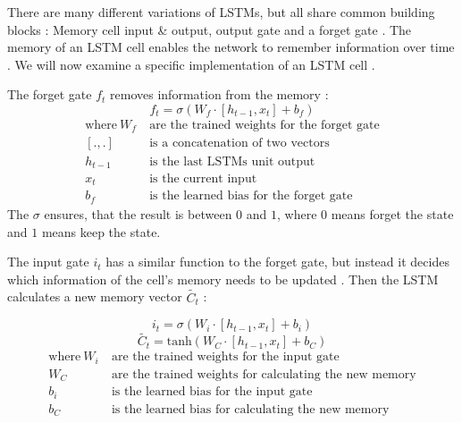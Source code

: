 \documentclass[draft,final,oneside]{vutinfth} %
\begin{document}
There are many different variations of LSTMs, but all share common building blocks  \cite{colahlstm}: Memory cell input \& output, output gate and a forget gate  \cite{colahlstm}. The memory of an LSTM cell enables the network to remember information over time \cite{hochreiter}. We will now examine a specific implementation of an LSTM cell \cite{colahlstm}.

The forget gate $f_t$ removes information from the memory \cite{colahlstm}:
\begin{equation}
f_t = \sigma \left(W_f \cdot \left[ h_{t-1}, x_t \right] + b_f\right)
\end{equation}
\begin{align*}
\text{where}~W_f&~\text{are the trained weights for the forget gate} \\
\left[. , . \right]&~\text{is a concatenation of two vectors} \\
h_{t-1}&~\text{is the last LSTMs unit output} \\
x_t&~\text{is the current input} \\
b_f&~\text{is the learned bias for the forget gate}
\end{align*}
The $\sigma$ ensures, that the result is between $0$ and $1$, where $0$ means forget the state and $1$ means keep the state.

The input gate $i_t$ has a similar function to the forget gate, but instead it decides which information of the cell's memory needs to be updated \cite{hochreiter}. Then the LSTM calculates a new memory vector $\widetilde{C_t}$ \cite{colahlstm}:  

\begin{equation}
i_t=\sigma\left(W_i \cdot \left[ h_{t-1}, x_t\right] + b_i \right)
\end{equation}
\begin{equation}
\widetilde{C_t} = \text{tanh}\left( W_C \cdot \left[ h_{t-1}, x_t \right] + b_C \right)
\end{equation}
\begin{align*}
\text{where}~W_i&~\text{are the trained weights for the input gate} \\
W_C&~\text{are the trained weights for calculating the new memory} \\
b_i&~\text{is the learned bias for the input gate} \\
b_C&~\text{is the learned bias for calculating the new memory} \\
\end{align*}
\end{document}
